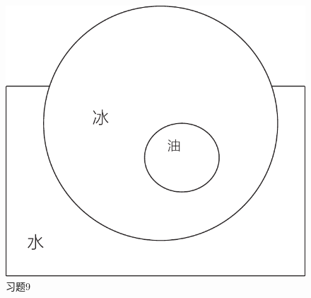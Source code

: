 \documentclass[a4paper, 11pt, oneside]{article}
\begin{document}
\\
\begin{figure}[!h]
\center
\includegraphics[scale=0.6]{./asset/buoyancy_3.pdf}
\caption{习题9}
\end{figure}
\end{document}

